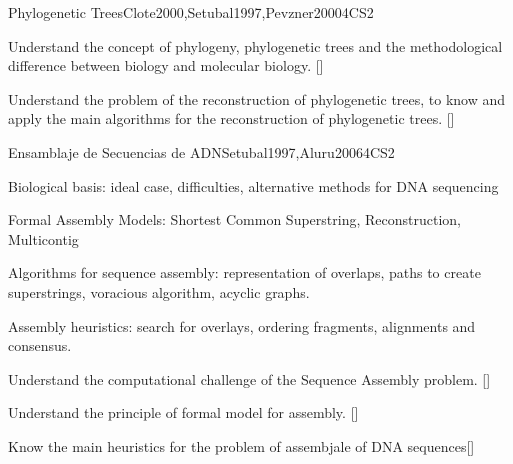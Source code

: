 \begin{syllabus}
\begin{unit}{Phylogenetic Trees}{}{Clote2000,Setubal1997,Pevzner2000}{4}{CS2}
\begin{learningoutcomes}
\item Understand the concept of phylogeny, phylogenetic trees and the methodological difference between biology and molecular biology. [\Familiarity]
\item Understand the problem of the reconstruction of phylogenetic trees, to know and apply the main algorithms for the reconstruction of phylogenetic trees. [\Assessment]
\end{learningoutcomes}
\end{unit}

\begin{unit}{Ensamblaje de Secuencias de ADN}{}{Setubal1997,Aluru2006}{4}{CS2}
\begin{topics}
\item Biological basis: ideal case, difficulties, alternative methods for DNA sequencing
\item Formal Assembly Models: Shortest Common Superstring, Reconstruction, Multicontig
\item Algorithms for sequence assembly: representation of overlaps, paths to create superstrings, voracious algorithm, acyclic graphs.
\item Assembly heuristics: search for overlays, ordering fragments, alignments and consensus.
\end{topics}

\begin{learningoutcomes}
\item Understand the computational challenge of the Sequence Assembly problem. [\Familiarity]
\item Understand the principle of formal model for assembly. [\Assessment]
\item Know the main heuristics for the problem of assembjale of DNA sequences[\Usage]
\end{learningoutcomes}
\end{unit}


\end{syllabus}
